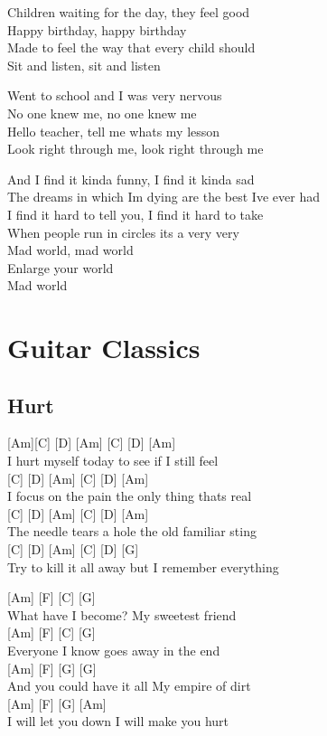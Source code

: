 \documentclass[
  letterpaper,
]{scrbook}
\begin{document}
Children waiting for the day, they feel good\\
Happy birthday, happy birthday\\
Made to feel the way that every child should\\
Sit and listen, sit and listen

Went to school and I was very nervous\\
No one knew me, no one knew me\\
Hello teacher, tell me what\textquotesingle s my lesson\\
Look right through me, look right through me

And I find it kinda funny, I find it kinda sad\\
The dreams in which I\textquotesingle m dying are the best
I\textquotesingle ve ever had\\
I find it hard to tell you, I find it hard to take\\
When people run in circles it\textquotesingle s a very very\\
Mad world, mad world\\
Enlarge your world\\
Mad world

\part{Guitar Classics}

\hypertarget{hurt}{%
\chapter{Hurt}\label{hurt}}

{[}Am{]}{[}C{]} {[}D{]} {[}Am{]} {[}C{]} {[}D{]} {[}Am{]}\\
I hurt myself today to see if I still feel\\
{[}C{]} {[}D{]} {[}Am{]} {[}C{]} {[}D{]} {[}Am{]}\\
I focus on the pain the only thing that\textquotesingle s real\\
{[}C{]} {[}D{]} {[}Am{]} {[}C{]} {[}D{]} {[}Am{]}\\
The needle tears a hole the old familiar sting\\
{[}C{]} {[}D{]} {[}Am{]} {[}C{]} {[}D{]} {[}G{]}\\
Try to kill it all away but I remember everything

{[}Am{]} {[}F{]} {[}C{]} {[}G{]}\\
What have I become? My sweetest friend\\
{[}Am{]} {[}F{]} {[}C{]} {[}G{]}\\
Everyone I know goes away in the end\\
{[}Am{]} {[}F{]} {[}G{]} {[}G{]}\\
And you could have it all My empire of dirt\\
{[}Am{]} {[}F{]} {[}G{]} {[}Am{]}\\
I will let you down I will make you hurt
\end{document}
